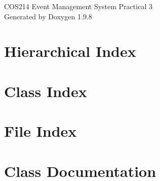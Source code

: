 \documentclass[twoside]{book}
\newcommand{\+}{\discretionary{\mbox{\scriptsize$\hookleftarrow$}}{}{}}
\newcommand{\clearemptydoublepage}{%
    \newpage{\pagestyle{empty}\cleardoublepage}%
  }
\begin{document}
  \raggedbottom
    \hypersetup{pageanchor=false,
                bookmarksnumbered=true,
                pdfencoding=unicode
               }
  \begin{titlepage}
  \vspace*{7cm}
  \begin{center}%
  {\Large COS214 Event Management System Practical 3}\\
  \vspace*{1cm}
  {\large Generated by Doxygen 1.9.8}\\
  \end{center}
  \end{titlepage}
  \clearemptydoublepage
  \tableofcontents
  \clearemptydoublepage
  \hypersetup{pageanchor=true}
\chapter{Hierarchical Index}

\chapter{Class Index}

\chapter{File Index}

\chapter{Class Documentation}












\end{document}
